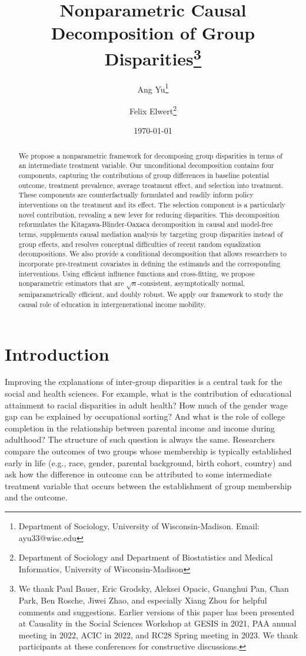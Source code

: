 \documentclass[12pt,a4paper]{article}
\title{\Large Nonparametric Causal Decomposition of Group Disparities\thanks{We thank Paul Bauer, Eric Grodsky, Aleksei Opacic, Guanghui Pan, Chan Park, Ben Rosche, Jiwei Zhao, and especially Xiang Zhou for helpful comments and suggestions. Earlier versions of this paper has been presented at Causality in the Social Sciences Workshop at GESIS in 2021, PAA annual meeting in 2022, ACIC in 2022, and RC28 Spring meeting in 2023. We thank participants at these conferences for constructive discussions.}}
\author{\large Ang Yu\thanks{Department of Sociology, University of Wisconsin-Madison. Email: ayu33@wisc.edu} \and Felix Elwert\thanks{Department of Sociology and Department of Biostatistics and Medical Informatics, University of Wisconsin-Madison}}
\date{\large \today}
\begin{document}
\maketitle

\begin{abstract}
We propose a nonparametric framework for decomposing group disparities in terms of an intermediate treatment variable. Our unconditional decomposition contains four components, capturing the contributions of group differences in baseline potential outcome, treatment prevalence, average treatment effect, and selection into treatment. These components are counterfactually formulated and readily inform policy interventions on the treatment and its effect. The selection component is a particularly novel contribution, revealing a new lever for reducing disparities. This decomposition reformulates the Kitagawa-Blinder-Oaxaca decomposition in causal and model-free terms, supplements causal mediation analysis by targeting group disparities instead of group effects, and resolves conceptual difficulties of recent random equalization decompositions. We also provide a conditional decomposition that allows researchers to incorporate pre-treatment covariates in defining the estimands and the corresponding interventions. Using efficient influence functions and cross-fitting, we propose nonparametric estimators that are $\sqrt{n}$-consistent, asymptotically normal, semiparametrically efficient, and doubly robust. We apply our framework to study the causal role of education in intergenerational income mobility.
\end{abstract}

\section{Introduction}

Improving the explanations of inter-group disparities is a central task for the social and health sciences. For example, what is the contribution of educational attainment to racial disparities in adult health? How much of the gender wage gap can be explained by occupational sorting? And what is the role of college completion in the relationship between parental income and income during adulthood? The structure of such question is always the same. Researchers compare the outcomes of two groups whose membership is typically established early in life (e.g., race, gender, parental background, birth cohort, country) and ask how the difference in outcome can be attributed to some intermediate treatment variable that occurs between the establishment of group membership and the outcome. 
\end{document}
